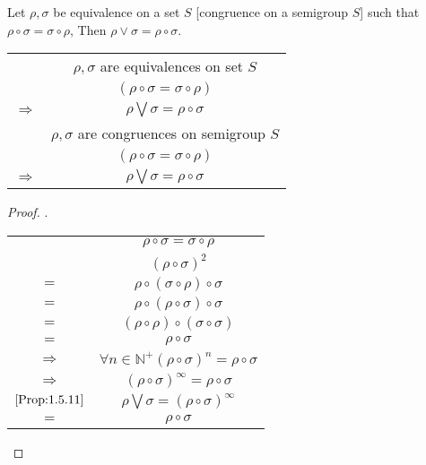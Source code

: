 \begin{Coly}\label{Coly:1.5.12}
    Let $\rho, \sigma$ be equivalence on a set $S$ [congruence on a semigroup $S$] such that $\rho \circ \sigma = \sigma \circ \rho$, Then $\rho \vee \sigma =  \rho \circ \sigma$.
    
    \begin{center}
        \begin{tabular}{c c}
            & $\rho, \sigma$ are equivalences on set $S$ \\
            & $(\rho \circ \sigma = \sigma \circ \rho)$ \\
            $\Rightarrow $ & $\rho \bigvee \sigma = \rho \circ \sigma$  \\
            & $\rho, \sigma$ are congruences on semigroup $S$ \\
            & $(\rho \circ \sigma = \sigma \circ \rho)$ \\
            $\Rightarrow $ & $\rho \bigvee \sigma = \rho \circ \sigma$  \\
        \end{tabular}
    \end{center}

    \begin{proof}.
        \begin{center}
            \begin{tabular}{c c}
                & $\rho \circ \sigma = \sigma \circ \rho$   \\
                & $(\rho \circ \sigma)^2$    \\
                $=$ & $\rho \circ (\sigma \circ \rho) \circ \sigma$ \\
                $=$ & $\rho \circ (\rho \circ \sigma) \circ \sigma$ \\
                $=$ & $(\rho \circ \rho) \circ (\sigma \circ \sigma)$   \\
                $=$ & $\rho \circ \sigma$   \\
                $\Rightarrow$ & $\forall n\in \mathbb{N}^{+}(\rho \circ \sigma)^n = \rho \circ \sigma$    \\
                $\Rightarrow$ & $(\rho \circ \sigma)^{\infty} = \rho \circ \sigma$  \\
                $\ref{Prop:1.5.11}$ & $\rho \bigvee \sigma = (\rho \circ \sigma)^{\infty}$   \\
                $=$ & $\rho \circ \sigma$   \\
            \end{tabular}
        \end{center}
    \end{proof}
\end{Coly}



